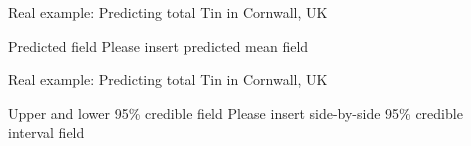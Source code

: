 \documentclass{beamer}
\begin{document}
\begin{frame}{Real example: Predicting total Tin in Cornwall, UK}
\begin{block}{Predicted field}
Please insert predicted mean field
\end{block}

\end{frame}

\begin{frame}{Real example: Predicting total Tin in Cornwall, UK}
\begin{block}{Upper and lower 95\% credible field}
Please insert side-by-side 95\% credible interval field
\end{block}
\end{frame}
\end{document}

